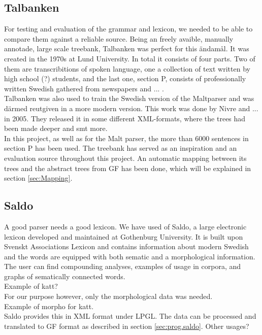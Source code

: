 \documentclass{report}
\begin{document}
\subsection{Talbanken}
For testing and evaluation of the grammar and lexicon, we needed to be able to
compare them against a reliable source.
Being an freely avaible, manually annotade, large scale treebank,
Talbanken\cite{talbanken} was perfect for this ändamål.
It was created in the 1970s at Lund University. In total it consists of four
parts. Two of them are transcribitions of spoken language, one a collection of
text written by high school (?) students, and the last one, section P,
consists of professionally written Swedish gathered from newspapers and ... .\\
Talbanken was also used to train the Swedish version of the Maltparser\cite{mal}
and was därmed reutgiven in a more modern version\cite{nivre}. This work
was done by Nivre and ... in 2005. They released it in some different XML-formats,
where the trees had been made deeper and smt more. \\
In this project, as well as for the Malt parser, the more than 6000 sentences
in section P has been used.
The treebank has served as an inspiration and an evaluation source throughout this
project. An automatic mapping between its trees and the abstract trees from GF has been
done, which will be explained in section \ref{sec:Mapping}.

\subsection{Saldo}
A good parser needs a good lexicon. We have used of Saldo\cite{saldo}, a
large electronic lexicon developed and maintained at Gothenburg University. It is
built upon Svenskt Associations Lexicon and contains information about modern
Swedish and the words are equipped with both sematic and a morphological
information. The user can find compounding analyses, examples of usage in corpora,
and graphs of sematically connected words.\\
Example of katt? \\
For our purpose however, only the morphological data was needed.\\
Example of morpho for katt.\\
Saldo provides this in XML format under LPGL. The data can be processed and translated to GF format as described in 
section \ref{sec:prog.saldo}.
Other usages?
\end{document}
